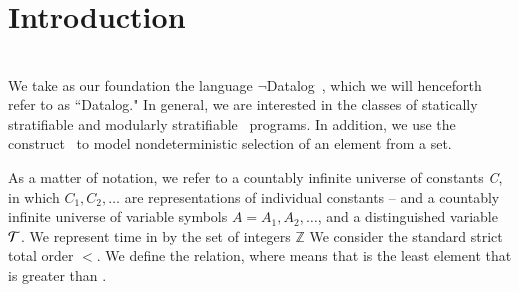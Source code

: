 \section{Introduction}







\section{\large \bf \slang}
We take as our foundation the language $\lnot$Datalog~\cite{ullmanbook}, which
we will henceforth refer to as ``Datalog." In general, we are interested in the
classes of statically stratifiable 
and modularly stratifiable~\cite{modular} programs.  In addition, we use
the  construct~\cite{greedychoice, eventchoice} to model
nondeterministic selection of an element from a set.  

As a matter of notation, we refer to a countably infinite universe of constants
\emph{C}, in which $C_{1}, C_{2}, \ldots$ are representations of individual
constants -- and a countably infinite universe of variable symbols $A = A_1,
A_2, \ldots$, and a distinguished variable $\Tau$.
We represent time in \slang by the set of integers $\mathbb{Z}$ We consider the
standard strict total order $<$. We define the  relation,
where  means that  is the least element that
is greater than .


